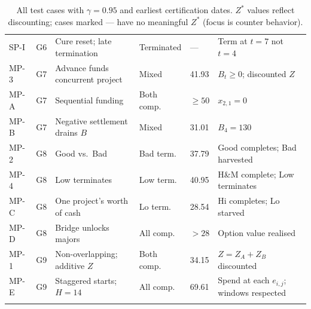 \documentclass[11pt, a4paper]{article}
\begin{document}
\begin{longtable}{p{1.1cm}p{1.3cm}p{3.5cm}p{1.8cm}p{1.4cm}p{3.8cm}}
SP-I  & G6 & Cure reset; late termination & Terminated & --- &
  Term at $t=7$ not $t=4$\\
MP-3  & G7 & Advance funds concurrent project & Mixed & 41.93 &
  $B_t\geq0$; discounted $Z$\\
MP-A  & G7 & Sequential funding & Both comp. & $\geq50$ &
  $x_{2,1}=0$\\
MP-B  & G7 & Negative settlement drains $B$ & Mixed & 31.01 &
  $B_4=130$\\
MP-2  & G8 & Good vs.\ Bad & Bad term. & 37.79 &
  Good completes; Bad harvested\\
MP-4  & G8 & Low terminates & Low term. & 40.95 &
  H\&M complete; Low terminates\\
MP-C  & G8 & One project's worth of cash & Lo term. & 28.54 &
  Hi completes; Lo starved\\
MP-D  & G8 & Bridge unlocks majors & All comp. & $>28$ &
  Option value realised\\
MP-1  & G9 & Non-overlapping; additive $Z$ & Both comp. & 34.15 &
  $Z=Z_A+Z_B$ discounted\\
MP-E  & G9 & Staggered starts; $H=14$ & All comp. & 69.61 &
  Spend at each $e_{i,j}$; windows respected\\
\bottomrule
\caption{All test cases with $\gamma=0.95$ and earliest certification
  dates. $Z^*$ values reflect discounting; cases marked --- have no
  meaningful $Z^*$ (focus is counter behavior).}
\label{tab:summary}
\end{longtable}
\end{document}
